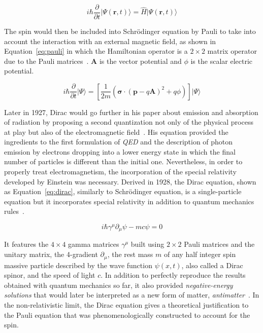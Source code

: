 	\begin{equation}
		\label{eq:schrodinger}
		i\hbar \frac{\partial}{\partial t} \vert \Psi(\mathbf{r},t)\rangle  = \hat{H} \vert \Psi(\mathbf{r},t)\rangle
	\end{equation}
	
	The spin would then be included into Schrödinger equation by Pauli to take into account the interaction with an external magnetic field, as shown in Equation~\ref{eq:pauli} in which the Hamiltonian operator is a $2 \times 2$ matrix operator due to the Pauli matrices~\cite{PAULI1927}. $\mathbf{A}$ is the vector potential and $\phi$ is the scalar electric potential.
	
	\begin{equation}
		\label{eq:pauli}
		i\hbar \frac{\partial}{\partial t} \vert\Psi\rangle  =  \left[\frac{1}{2m}(\mathbf{\sigma}\cdot(\mathbf{p}-q\mathbf{A})^2+q\phi)\right]\vert\Psi\rangle
	\end{equation}
	
	Later in 1927, Dirac would go further in his paper about emission and absorption of radiation by proposing a second quantization not only of the physical process at play but also of the electromagnetic field~\cite{DIRAC1927}. His equation provided the ingredients to the first formulation of \textit{\acf{QED}} and the description of photon emission by electrons dropping into a lower energy state in which the final number of particles is different than the initial one. Nevertheless, in order to properly treat electromagnetism, the incorporation of the special relativity developed by Einstein was necessary. Derived in 1928, the Dirac equation, shown as Equation~\ref{eq:dirac}, similarly to Schrödinger equation, is a single-particle equation but it incorporates special relativity in addition to quantum mechanics rules~\cite{DIRAC1928}.
	
	\begin{equation}
		\label{eq:dirac}
		i\hbar \gamma^\mu\partial_\mu\psi - mc\psi = 0
	\end{equation}
	
	It features the $4 \times 4$ gamma matrices $\gamma^\mu$ built using $2 \times 2$ Pauli matrices and the unitary matrix, the 4-gradient $\partial_\mu$, the rest mass $m$ of any half integer spin massive particle described by the wave function $\psi(x,t)$, also called a Dirac spinor, and the speed of light $c$. In addition to perfectly reproduce the results obtained with quantum mechanics so far, it also provided \textit{negative-energy solutions} that would later be interpreted as a new form of matter, \textit{antimatter}~\cite{OPPENHEIMER1930I,DIRAC1931}. In the non-relativistic limit, the Dirac equation gives a theoretical justification to the Pauli equation that was phenomenologically constructed to account for the spin.
	
